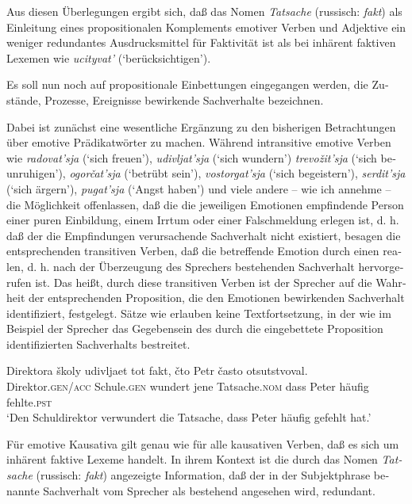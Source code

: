 \documentclass[output=paper]{langscibook}
\begin{document}
\begin{otherlanguage}{german}
Aus diesen Überlegungen ergibt sich, daß das Nomen \textit{Tatsache} (russisch: \textit{fakt}) als Einleitung eines propositionalen Komplements emotiver Verben und Adjektive ein weniger redundantes Ausdrucksmittel für Faktivität ist als bei inhärent faktiven Lexemen wie \textit{ucityvat’} (‘berücksichtigen’).

Es soll nun noch auf propositionale Einbettungen eingegangen werden, die Zustände, Prozesse, Ereignisse bewirkende Sachverhalte bezeichnen.

Dabei ist zunächst eine wesentliche Ergänzung zu den bisherigen Betrachtungen über emotive Prädikatwörter zu machen. Während intransitive emotive Verben wie \textit{radovat’sja} (‘sich freuen’), \textit{udivljat’sja} (‘sich wundern’) \textit{trevožit’sja} (‘sich beunruhigen’), \textit{ogorčat’sja} (‘betrübt sein’), \textit{vostorgat’sja} (‘sich begeistern’), \textit{serdit’sja} (‘sich ärgern’), \textit{pugat’sja} (‘Angst haben’) und viele andere -- wie ich annehme -- die Möglichkeit offenlassen, daß die die jeweiligen Emotionen em\-pfin\-den\-de Person einer puren Einbildung, einem Irrtum oder einer Falschmeldung erlegen ist, d. h. daß der die Empfindungen verursachende Sachverhalt nicht exi\-stiert, besagen die entsprechenden transitiven Verben, daß die betreffende Emotion durch einen realen, d. h. nach der Überzeugung des Sprechers bestehenden Sachverhalt hervorgerufen ist. Das heißt, durch diese transitiven Verben ist der Sprecher auf die Wahrheit der entsprechenden Proposition, die den Emotionen bewirkenden Sachverhalt identifiziert, festgelegt. Sätze wie  erlauben keine Textfortsetzung, in der wie im Beispiel  der Sprecher das Gegebensein des durch die eingebettete Proposition identifizierten Sachverhalts bestreitet. 

\ea \label{ex:zi83:53}
    \gll Direktora školy udivljaet tot fakt, čto Petr často otsutstvoval. \\
    Direktor.\textsc{gen}/\textsc{acc} Schule.\textsc{gen} wundert jene Tatsache.\textsc{nom} dass Peter häufig fehlte.\textsc{pst} \\
    \glt ‘Den Schuldirektor verwundert die Tatsache, dass Peter häufig gefehlt hat.’
\z

\noindent Für emotive Kausativa gilt genau wie für alle kausativen Verben, daß es sich um inhärent faktive Lexeme handelt. In ihrem Kontext ist die durch das Nomen \textit{Tatsache} (russisch: \textit{fakt}) angezeigte Information, daß der in der Subjektphrase benannte Sachverhalt vom Sprecher als bestehend angesehen wird, redundant.


\end{otherlanguage}
\end{document}
